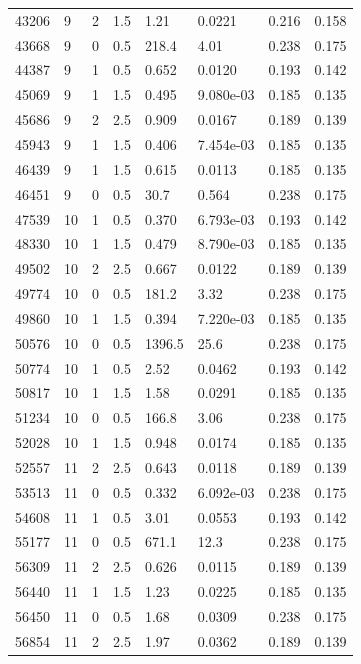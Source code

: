 \documentclass[preview]{standalone}
\begin{document}
{{{\begin{tabular}{L{1.2cm}C{1.2cm} C{0.3cm}C{0.5cm} C{1.4cm}C{1.4cm} C{1.4cm}C{1.4cm}}
  43206  &     9  & 2     & 1.5 &  1.21  & 0.0221  & 0.216 &  0.158   \\ 
  43668  &     9  & 0     & 0.5 &  218.4  & 4.01  & 0.238 &  0.175   \\ 
  44387  &     9  & 1     & 0.5 &  0.652  & 0.0120  & 0.193 &  0.142   \\ 
  45069  &     9  & 1     & 1.5 &  0.495  & 9.080e-03  & 0.185 &  0.135   \\ 
  45686  &     9  & 2     & 2.5 &  0.909  & 0.0167  & 0.189 &  0.139   \\ 
  45943  &     9  & 1     & 1.5 &  0.406  & 7.454e-03  & 0.185 &  0.135   \\ 
  46439  &     9  & 1     & 1.5 &  0.615  & 0.0113  & 0.185 &  0.135   \\ 
  46451  &     9  & 0     & 0.5 &  30.7  & 0.564  & 0.238 &  0.175   \\ 
  47539  &    10  & 1     & 0.5 &  0.370  & 6.793e-03  & 0.193 &  0.142   \\ 
  48330  &    10  & 1     & 1.5 &  0.479  & 8.790e-03  & 0.185 &  0.135   \\ 
  49502  &    10  & 2     & 2.5 &  0.667  & 0.0122  & 0.189 &  0.139   \\ 
  49774  &    10  & 0     & 0.5 &  181.2  & 3.32  & 0.238 &  0.175   \\ 
  49860  &    10  & 1     & 1.5 &  0.394  & 7.220e-03  & 0.185 &  0.135   \\ 
  50576  &    10  & 0     & 0.5 &  1396.5  & 25.6  & 0.238 &  0.175   \\ 
  50774  &    10  & 1     & 0.5 &  2.52  & 0.0462  & 0.193 &  0.142   \\ 
  50817  &    10  & 1     & 1.5 &  1.58  & 0.0291  & 0.185 &  0.135   \\ 
  51234  &    10  & 0     & 0.5 &  166.8  & 3.06  & 0.238 &  0.175   \\ 
  52028  &    10  & 1     & 1.5 &  0.948  & 0.0174  & 0.185 &  0.135   \\ 
  52557  &    11  & 2     & 2.5 &  0.643  & 0.0118  & 0.189 &  0.139   \\ 
  53513  &    11  & 0     & 0.5 &  0.332  & 6.092e-03  & 0.238 &  0.175   \\ 
  54608  &    11  & 1     & 0.5 &  3.01  & 0.0553  & 0.193 &  0.142   \\ 
  55177  &    11  & 0     & 0.5 &  671.1  & 12.3  & 0.238 &  0.175   \\ 
  56309  &    11  & 2     & 2.5 &  0.626  & 0.0115  & 0.189 &  0.139   \\ 
  56440  &    11  & 1     & 1.5 &  1.23  & 0.0225  & 0.185 &  0.135   \\ 
  56450  &    11  & 0     & 0.5 &  1.68  & 0.0309  & 0.238 &  0.175   \\ 
  56854  &    11  & 2     & 2.5 &  1.97  & 0.0362  & 0.189 &  0.139   \\ 
\hline 
\end{tabular} 

}}}
\end{document}
